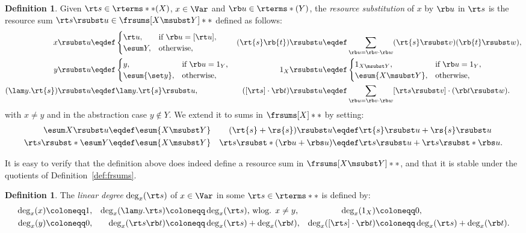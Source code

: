 \documentclass[10pt,a4paper]{amsart}
\theoremstyle{definition}
\newtheorem{definition}[theorem]{Definition}
\begin{document}
\begin{definition} \label{def:rsubst}
	Given $\rt s \in \rterms**(X)$, $x \in \Var$ and $\rb u \in \rterms*(Y)$,
	the \emph{resource substitution} of $x$ by $\rb u$ in $\rt s$
	is the resource sum $\rt s \rsubst u \in \frsums[X \msubst Y]**$
	defined as follows:
	\begin{align*}
		x \rsubst u & \eqdef 
			\begin{cases}
			\rt u,& \text{if $\rb u = [\rt u]$},\\
			\esum Y, & \text{otherwise},
			\end{cases} &
		(\rt{s}\rb{t}) \rsubst u & \eqdef 
			\sum_{\rb u = \rb v \cdot \rb w}
			(\rt{s}\rsubst v)( \rb{t}\rsubst w),\\
		y  \rsubst u & \eqdef 
			\begin{cases}
			y, & \text{if $\rb u = 1_Y$,} \\
			\esum {\set y}, & \text{otherwise},
			\end{cases}&
		1_X \rsubst u & \eqdef 
			\begin{cases}
			1_{X \msubst Y}, & \text{if $\rb u = 1_Y$}, \\
			\esum {X \msubst Y}, & \text{otherwise,} \\
			\end{cases}\\
		(\lam y.\rt{s}) \rsubst u & \eqdef 
			\lam y.\rt{s} \rsubst u, &
		([\rt s] \cdot \rb t) \rsubst u & \eqdef
			\sum_{\rb u = \rb v \cdot \rb w}
			[\rt s \rsubst v] \cdot (\rb t \rsubst w).
	\end{align*}
	with $x \neq y$ and in the abstraction case $y \notin Y$.
	We extend it to sums in $\frsums[X]**$ by setting:
	\begin{align*}
		\esum X \rsubst u & \eqdef \esum {X\msubst Y} &
		(\rt{s} + \rs{s}) \rsubst u & \eqdef 
			\rt{s} \rsubst u + \rs{s} \rsubst u \\
		\rt s \rsubst* {\esum Y} & \eqdef \esum {X \msubst Y} &
		\rt s \rsubst* {(\rb u + \rbs u)} & \eqdef
			\rt s \rsubst u + \rt s \rsubst* {\rbs u}.
	\end{align*}
\end{definition}

It is easy to verify that the definition above does indeed define a resource sum in $\frsums[X \msubst Y]**$, and that it is stable under the quotients of Definition~\ref{def:frsums}.

\begin{definition}The \emph{linear degree} $\deg_x(\rt s)$ of $x \in \Var$
	in some $\rt s \in \rterms**$ is defined by:
	\begin{align*}
	\deg_x(x) & \coloneqq 1, &
	\deg_x(\lam y.\rt s) & \coloneqq \deg_x(\rt s)
		\text{, wlog. $x\neq y$,} &
	\deg_x(1_X) & \coloneqq 0, \\
	\deg_x(y) & \coloneqq 0 ,&
	\deg_x(\rt s \rb t) & \coloneqq \deg_x(\rt s) + \deg_x(\rb t), &
	\deg_x([\rt s] \cdot \rb t) & \coloneqq \deg_x(\rt s) + \deg_x(\rb t).
	\end{align*}

\end{definition}
\end{document}
